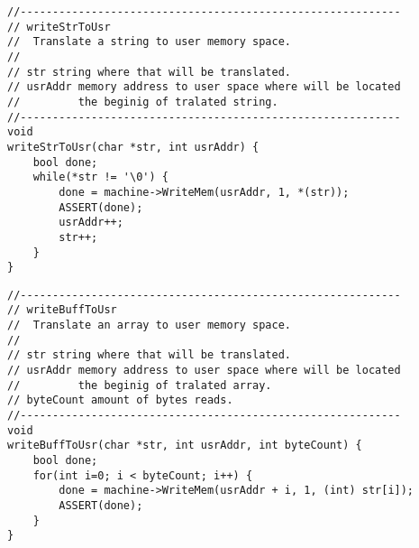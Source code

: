 \begin{lstlisting}[style=C]
//-----------------------------------------------------------
// writeStrToUsr
//  Translate a string to user memory space.
//
// str string where that will be translated.
// usrAddr memory address to user space where will be located
//         the beginig of tralated string.
//-----------------------------------------------------------
void
writeStrToUsr(char *str, int usrAddr) {
    bool done;
    while(*str != '\0') {
        done = machine->WriteMem(usrAddr, 1, *(str));
        ASSERT(done);
        usrAddr++;
        str++;
    }
}
\end{lstlisting}
\begin{lstlisting}[style=C]
//-----------------------------------------------------------
// writeBuffToUsr
//  Translate an array to user memory space.
//
// str string where that will be translated.
// usrAddr memory address to user space where will be located
//         the beginig of tralated array.
// byteCount amount of bytes reads.
//-----------------------------------------------------------
void
writeBuffToUsr(char *str, int usrAddr, int byteCount) {
    bool done;
    for(int i=0; i < byteCount; i++) {
        done = machine->WriteMem(usrAddr + i, 1, (int) str[i]);
        ASSERT(done);
    }
}
\end{lstlisting}
